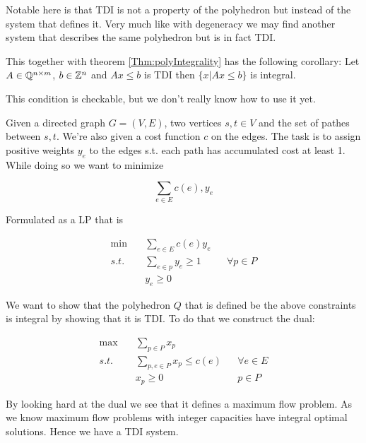 Notable here is that TDI is not a property of the polyhedron but instead of the system that defines it. Very much like with degeneracy we may find another system that describes the same polyhedron but is in fact TDI.

This together with theorem \ref{Thm:polyIntegrality} has the following corollary: Let $A\in \mathbb{Q}^{n\times m}$, $b\in \mathbb{Z}^n$ and $Ax\leq b$ is TDI then $\{x|Ax\leq b\}$ is integral.

This condition is checkable, but we don't really know how to use it yet.

\begin{Ex} Given a directed graph $G=(V,E)$, two vertices $s,t\in V$ and the set of pathes between $s,t$. We're also given a cost function $c$ on the edges. The task is to assign positive weights $y_e$ to the edges s.t. each path has accumulated cost at least 1. While doing so we want to minimize

\[\sum_{e\in E} c(e), y_e\]

Formulated as a LP that is 

\begin{align*}
\min \quad & \sum_{e\in E} c(e) y_e\\
s.t. & \sum_{e\in p} y_e \geq 1 && \forall p\in P\\
&y_e \geq 0
\end{align*}

We want to show that the polyhedron $Q$ that is defined be the above constraints is integral by showing that it is TDI. To do that we construct the dual:

\begin{align*}
\max \quad & \sum_{p\in P} x_p\\
s.t. & \sum_{p,e\in P} x_p \leq c(e) && \forall e\in E\\
 & x_p \geq 0 && p\in P
\end{align*}

By looking hard at the dual we see that it defines a maximum flow problem. As we know maximum flow problems with integer capacities have integral optimal solutions. Hence we have a TDI system.
\end{Ex}